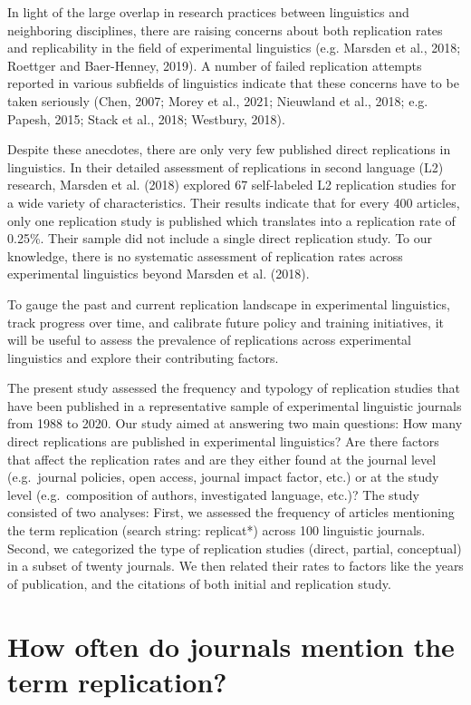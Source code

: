 \documentclass[]{elsarticle} %
\begin{document}
In light of the large overlap in research practices between linguistics and neighboring disciplines, there are raising concerns about both replication rates and replicability in the field of experimental linguistics (e.g. Marsden et al., 2018; Roettger and Baer-Henney, 2019). A number of failed replication attempts reported in various subfields of linguistics indicate that these concerns have to be taken seriously (Chen, 2007; Morey et al., 2021; Nieuwland et al., 2018; e.g. Papesh, 2015; Stack et al., 2018; Westbury, 2018).

Despite these anecdotes, there are only very few published direct replications in linguistics. In their detailed assessment of replications in second language (L2) research, Marsden et al. (2018) explored 67 self-labeled L2 replication studies for a wide variety of characteristics. Their results indicate that for every 400 articles, only one replication study is published which translates into a replication rate of 0.25\%. Their sample did not include a single direct replication study. To our knowledge, there is no systematic assessment of replication rates across experimental linguistics beyond Marsden et al. (2018).

To gauge the past and current replication landscape in experimental linguistics, track progress over time, and calibrate future policy and training initiatives, it will be useful to assess the prevalence of replications across experimental linguistics and explore their contributing factors.

The present study assessed the frequency and typology of replication studies that have been published in a representative sample of experimental linguistic journals from 1988 to 2020.
Our study aimed at answering two main questions:
How many direct replications are published in experimental linguistics?
Are there factors that affect the replication rates and are they either found at the journal level (e.g.~journal policies, open access, journal impact factor, etc.) or at the study level (e.g.~composition of authors, investigated language, etc.)?
The study consisted of two analyses:
First, we assessed the frequency of articles mentioning the term replication (search string: replicat*) across 100 linguistic journals.
Second, we categorized the type of replication studies (direct, partial, conceptual) in a subset of twenty journals. We then related their rates to factors like the years of publication, and the citations of both initial and replication study.

\hypertarget{how-often-do-journals-mention-the-term-replication}{%
\section{How often do journals mention the term replication?}\label{how-often-do-journals-mention-the-term-replication}}
\end{document}
